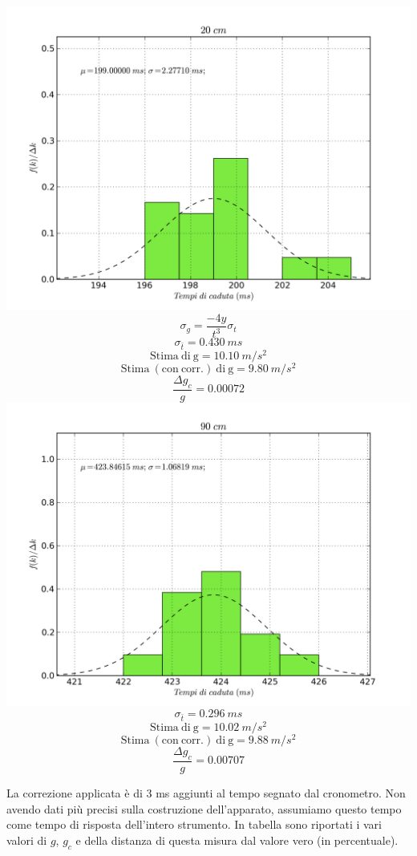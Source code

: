 \begin{center}
\includegraphics[scale=0.70]{../grafici/20cm.png}
$$\sigma_g = \frac{-4y}{t^3}\sigma_t $$
$$\sigma_{\bar{t}} = 0.430\ ms$$
$$\mathrm{Stima\ di\ g} = 10.10\ m/s^2$$
$$\mathrm{Stima\ (con\ corr.)\ di\ g} = 9.80\ m/s^2 $$
$$\frac{\Delta g_c}{g} = 0.00072$$
\includegraphics[scale=0.70]{../grafici/90cm.png}
$$\sigma_{\bar{t}} = 0.296\ ms $$
$$\mathrm{Stima\ di\ g} = 10.02\ m/s^2$$
$$\mathrm{Stima\ (con\ corr.)\ di\ g} = 9.88\ m/s^2 $$
$$\frac{\Delta g_c}{g} = 0.00707$$
\end{center}

La correzione applicata è di 3 ms aggiunti al tempo segnato dal cronometro. Non avendo dati più precisi sulla costruzione dell'apparato, assumiamo questo tempo come tempo di risposta dell'intero strumento. In tabella sono riportati i vari valori di $g$, $g_c$ e della distanza di questa misura dal valore vero (in percentuale).

